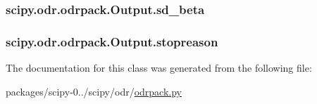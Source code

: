 \subsubsection[{sd\+\_\+beta}]{\setlength{\rightskip}{0pt plus 5cm}scipy.\+odr.\+odrpack.\+Output.\+sd\+\_\+beta}\label{classscipy_1_1odr_1_1odrpack_1_1Output_ac15599251123ceb0c17a229cb643e68b}
\hypertarget{classscipy_1_1odr_1_1odrpack_1_1Output_a5bd5f021366b91b22c62f76f307dc495}{}
\subsubsection[{stopreason}]{\setlength{\rightskip}{0pt plus 5cm}scipy.\+odr.\+odrpack.\+Output.\+stopreason}\label{classscipy_1_1odr_1_1odrpack_1_1Output_a5bd5f021366b91b22c62f76f307dc495}


The documentation for this class was generated from the following file\+:\begin{DoxyCompactItemize}
\item 
packages/scipy-\/0../scipy/odr/\hyperlink{odrpack_8py}{odrpack.\+py}\end{DoxyCompactItemize}
